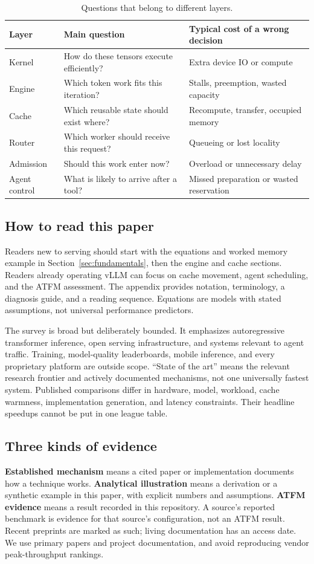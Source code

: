 \begin{table}[htbp]\centering\small
\caption{Questions that belong to different layers.}
\begin{tabularx}{\linewidth}{@{}lXX@{}}\toprule
Layer & Main question & Typical cost of a wrong decision\\\midrule
Kernel & How do these tensors execute efficiently? & Extra device IO or compute\\
Engine & Which token work fits this iteration? & Stalls, preemption, wasted capacity\\
Cache & Which reusable state should exist where? & Recompute, transfer, occupied memory\\
Router & Which worker should receive this request? & Queueing or lost locality\\
Admission & Should this work enter now? & Overload or unnecessary delay\\
Agent control & What is likely to arrive after a tool? & Missed preparation or wasted reservation\\\bottomrule
\end{tabularx}\end{table}

\subsection{How to read this paper}
Readers new to serving should start with the equations and worked memory example
in Section~\ref{sec:fundamentals}, then the engine and cache sections. Readers
already operating vLLM can focus on cache movement, agent scheduling, and the
ATFM assessment. The appendix provides notation, terminology, a diagnosis guide,
and a reading sequence. Equations are models with stated assumptions, not
universal performance predictors.

The survey is broad but deliberately bounded. It emphasizes autoregressive
transformer inference, open serving infrastructure, and systems relevant to
agent traffic. Training, model-quality leaderboards, mobile inference, and every
proprietary platform are outside scope. ``State of the art'' means the relevant
research frontier and actively documented mechanisms, not one universally
fastest system. Published comparisons differ in hardware, model, workload,
cache warmness, implementation generation, and latency constraints. Their
headline speedups cannot be put in one league table.

\subsection{Three kinds of evidence}
\label{sec:evidence-kinds}
\textbf{Established mechanism} means a cited paper or implementation documents
how a technique works. \textbf{Analytical illustration} means a derivation or a
synthetic example in this paper, with explicit numbers and assumptions.
\textbf{ATFM evidence} means a result recorded in this repository. A source's
reported benchmark is evidence for that source's configuration, not an ATFM
result. Recent preprints are marked as such; living documentation has an access
date. We use primary papers and project documentation, and avoid reproducing
vendor peak-throughput rankings.

